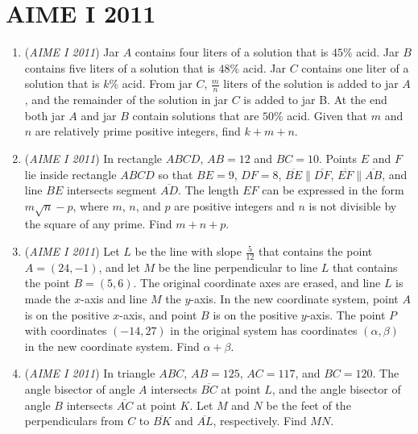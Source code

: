 \section{AIME I 2011}
        \begin{enumerate}
        	\item (\textit{AIME I 2011}) Jar $A$ contains four liters of a solution that is $45\%$ acid. Jar $B$ contains five liters of a solution that is $48\%$ acid. Jar $C$ contains one liter of a solution that is $k\%$ acid. From jar $C$, $\frac{m}{n}$ liters of the solution is added to jar $A$, and the remainder of the solution in jar $C$ is added to jar B. At the end both jar $A$ and jar $B$ contain solutions that are $50\%$ acid. Given that $m$ and $n$ are relatively prime positive integers, find $k + m + n$.


 

	\item (\textit{AIME I 2011}) In rectangle $ABCD$, $AB = 12$ and $BC = 10$.  Points $E$ and $F$ lie inside rectangle $ABCD$ so that $BE = 9$, $DF = 8$, $\overline{BE} \parallel \overline{DF}$, $\overline{EF} \parallel \overline{AB}$, and line $BE$ intersects segment $\overline{AD}$.  The length $EF$ can be expressed in the form $m \sqrt{n} - p$, where $m$, $n$, and $p$ are positive integers and $n$ is not divisible by the square of any prime.  Find $m + n + p$.


 

	\item (\textit{AIME I 2011}) Let $L$ be the line with slope $\frac{5}{12}$ that contains the point $A = (24,-1)$, and let $M$ be the line perpendicular to line $L$ that contains the point $B = (5,6)$.  The original coordinate axes are erased, and line $L$ is made the $x$-axis and line $M$ the $y$-axis.  In the new coordinate system, point $A$ is on the positive $x$-axis, and point $B$ is on the positive $y$-axis.  The point $P$ with coordinates $(-14,27)$ in the original system has coordinates $(\alpha,\beta)$ in the new coordinate system.  Find $\alpha + \beta$.


 

	\item (\textit{AIME I 2011}) In triangle $ABC$, $AB = 125$, $AC = 117$, and $BC = 120$.  The angle bisector of angle $A$ intersects $\overline{BC}$ at point $L$, and the angle bisector of angle $B$ intersects $\overline{AC}$ at point $K$.  Let $M$ and $N$ be the feet of the perpendiculars from $C$ to $\overline{BK}$ and $\overline{AL}$, respectively.  Find $MN$.



\end{enumerate}
